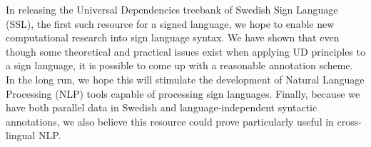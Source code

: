 \documentclass[11pt]{article}
\begin{document}
In releasing the Universal Dependencies treebank of Swedish Sign Language
(SSL), the first such resource for a signed language,
we hope to enable new computational research into sign language syntax.
We have shown that even though some theoretical and practical issues exist
when applying UD principles to a sign language, it is possible to come up with
a reasonable annotation scheme. In the long run, we hope this will
stimulate the development of Natural
Language Processing (NLP) tools capable of processing sign languages.
Finally, because we have both parallel data in Swedish and language-independent
syntactic annotations, we also believe this resource could prove particularly
useful in cross-lingual NLP.


%



\end{document}
